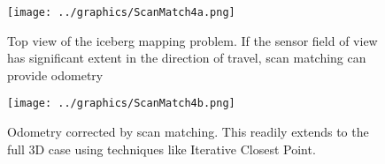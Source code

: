 %
\begin{figure}[!htb]
   \centering
   \texttt{[image: ../graphics/ScanMatch4a.png]} %
   \caption{Top view of the iceberg mapping problem. If the sensor field of view has significant extent in the direction of travel, scan matching can provide odometry}
   \label{fig:ScanMatch1}
   \end{figure}
    \begin{figure}[h]
   \centering
   \texttt{[image: ../graphics/ScanMatch4b.png]} %
   \caption{Odometry corrected by scan matching. This readily extends to the full 3D case using techniques like Iterative Closest Point.}
   \label{fig:ScanMatch2}
\end{figure}

